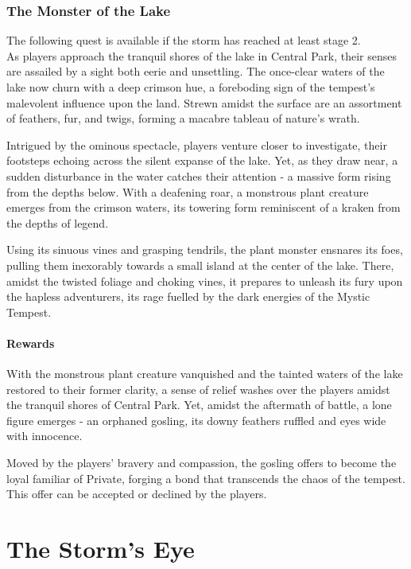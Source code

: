 \hfill\eject

\subsubsection*{The Monster of the Lake}
The following quest is available if the storm has reached at least stage 2.\\
As players approach the tranquil shores of the lake in Central Park, their senses are assailed by a sight both eerie and unsettling. The once-clear waters of the lake now churn with a deep crimson hue, a foreboding sign of the tempest's malevolent influence upon the land. Strewn amidst the surface are an assortment of feathers, fur, and twigs, forming a macabre tableau of nature's wrath.

Intrigued by the ominous spectacle, players venture closer to investigate, their footsteps echoing across the silent expanse of the lake. Yet, as they draw near, a sudden disturbance in the water catches their attention - a massive form rising from the depths below. With a deafening roar, a monstrous plant creature emerges from the crimson waters, its towering form reminiscent of a kraken from the depths of legend.

Using its sinuous vines and grasping tendrils, the plant monster ensnares its foes, pulling them inexorably towards a small island at the center of the lake. There, amidst the twisted foliage and choking vines, it prepares to unleash its fury upon the hapless adventurers, its rage fuelled by the dark energies of the Mystic Tempest.

\paragraph*{Rewards}
With the monstrous plant creature vanquished and the tainted waters of the lake restored to their former clarity, a sense of relief washes over the players amidst the tranquil shores of Central Park. Yet, amidst the aftermath of battle, a lone figure emerges - an orphaned gosling, its downy feathers ruffled and eyes wide with innocence.

Moved by the players' bravery and compassion, the gosling offers to become the loyal familiar of Private, forging a bond that transcends the chaos of the tempest. This offer can be accepted or declined by the players.

\section*{The Storm's Eye}

